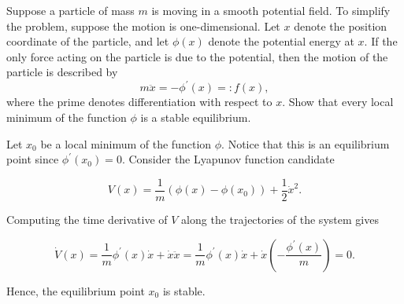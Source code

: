 \question[20] Suppose a particle of mass $m$ is moving in a smooth potential
field. To simplify the problem, suppose the motion is one-dimensional. Let $x$
denote the position coordinate of the particle, and let $\phi(x)$ denote the
potential energy at $x$. If the only force acting on the particle is due to the
potential, then the motion of the particle is described by \[ m \ddot{x} =
-\phi^\prime(x) =: f(x), \] where the prime denotes differentiation with respect
to $x$. Show that every local minimum of the function $\phi$ is a stable
equilibrium.


\begin{solution}

Let $x_0$ be a local minimum of the function $\phi$. Notice that this is an
equilibrium point since $\phi^\prime(x_0) = 0$. Consider the Lyapunov function
candidate

\[ V(x) = \frac{1}{m}\left( \phi(x)- \phi(x_0) \right) + \frac{1}{2}\dot{x}^2. \]

Computing the time derivative of $V$ along the trajectories of the system gives 

\[ \dot{V}(x) = \frac{1}{m}\phi^\prime(x)\dot{x} + \dot{x}\ddot{x} =
\frac{1}{m}\phi^\prime(x)\dot{x} + \dot{x}\left( -\frac{\phi^\prime(x)}{m}
\right) = 0. \]

Hence, the equilibrium point $x_0$ is stable.

\end{solution}